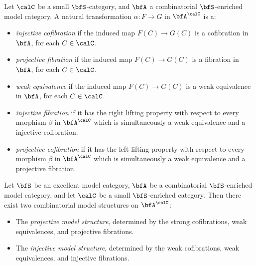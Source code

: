 \begin{definition}\label{projinj}
Let $\calC$ be a small $\bfS$-category, and $\bfA$ a combinatorial $\bfS$-enriched model category.
A natural transformation $\alpha: F \rightarrow G$ in $\bfA^{\calC}$ is a:

\begin{itemize}
\item {\it injective cofibration} if the induced map $F(C) \rightarrow
G(C)$ is a cofibration in $\bfA$, for each $C \in \calC$.

\item {\it projective fibration} if the induced map $F(C) \rightarrow
G(C)$ is a fibration in $\bfA$, for each $C \in \calC$.

\item {\it weak equivalence} if the induced map $F(C) \rightarrow
G(C)$ is a weak equivalence in $\bfA$, for each $C \in \calC$.

\item {\it injective fibration} if it has the right lifting property
with respect to every morphism $\beta$ in $\bfA^{\calC}$ which is
simultaneously a weak equivalence and a injective cofibration.

\item {\it projective cofibration} if it has the left lifting property
with respect to every morphism $\beta$ in $\bfA^{\calC}$ which is
simultaneously a weak equivalence and a projective fibration.
\end{itemize}
\end{definition}

\begin{proposition}\label{smurf}
Let $\bfS$ be an excellent model category, $\bfA$ be a combinatorial $\bfS$-enriched model category, and let $\calC$ be a small $\bfS$-enriched category. Then there exist two combinatorial model structures on $\bfA^{\calC}$:

\begin{itemize}
\item The {\it projective model structure}, determined by the strong
cofibrations, weak equivalences, and projective fibrations.

\item The {\it injective model structure}, determined by the weak
cofibrations, weak equivalences, and injective fibrations.
\end{itemize}
\end{proposition}

